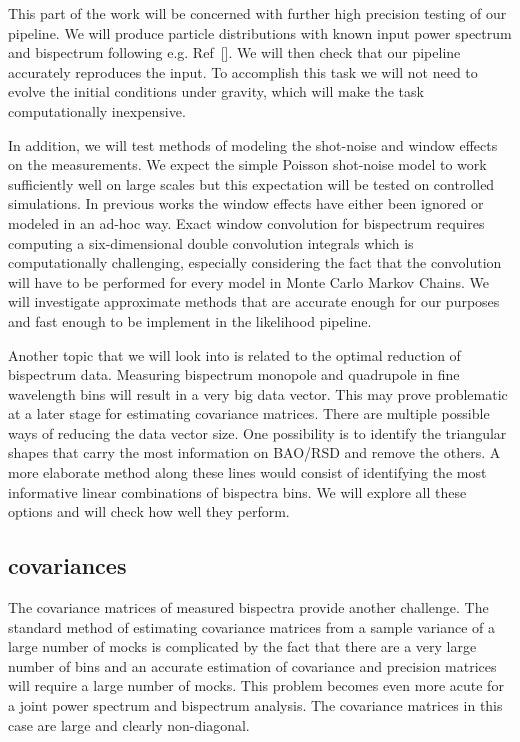 This part of the work will be concerned with further high precision testing of
our pipeline. We will produce particle distributions with known input power
spectrum and bispectrum following e.g. Ref~[]. We will then check that our
pipeline accurately reproduces the input. To accomplish this task we will not
need to evolve the initial conditions under gravity, which will make the task
computationally inexpensive. 

In addition, we will test methods of modeling the shot-noise and window effects
on the measurements. We expect the simple Poisson shot-noise model to work
sufficiently well on large scales but this expectation will be tested on
controlled simulations. In previous works the window effects have either been
ignored or modeled in an ad-hoc way. Exact window convolution for bispectrum
requires computing a six-dimensional double convolution integrals which is
computationally challenging, especially considering the fact that the
convolution will have to be performed for every model in Monte Carlo Markov
Chains. We will investigate approximate methods that are accurate enough for our
purposes and fast enough to be implement in the likelihood pipeline. 

Another topic that we will look into is related to the optimal reduction of
bispectrum data. Measuring bispectrum monopole and quadrupole in fine
wavelength bins will result in a very big data vector. This may prove
problematic at a later stage for estimating covariance matrices. There are
multiple possible ways of reducing the data vector size. One possibility is to
identify the triangular shapes that carry the most information on BAO/RSD and
remove the others. A more elaborate method along these lines would consist of
identifying the most informative linear combinations of bispectra bins. We will
explore all these options and will check how well they perform.

\subsection*{covariances}

The covariance matrices of measured bispectra provide another challenge. The
standard method of estimating covariance matrices from a sample variance of a
large number of mocks is complicated by the fact that there are a very large
number of bins and an accurate estimation of covariance and precision matrices
will require a large number of mocks. This problem becomes even more acute for
a joint power spectrum and bispectrum analysis. The covariance matrices in this
case are large and clearly non-diagonal.

